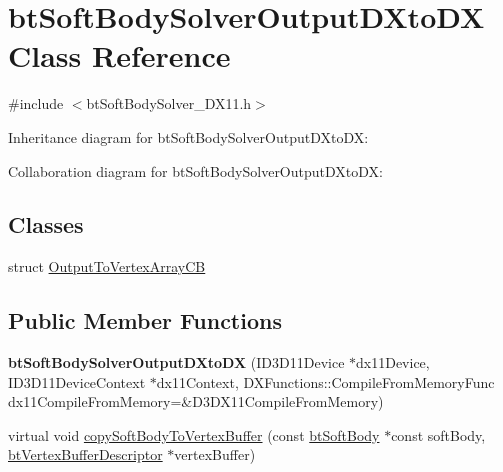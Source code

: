 \hypertarget{classbt_soft_body_solver_output_d_xto_d_x}{\section{bt\+Soft\+Body\+Solver\+Output\+D\+Xto\+D\+X Class Reference}
\label{classbt_soft_body_solver_output_d_xto_d_x}
}


{\ttfamily \#include $<$bt\+Soft\+Body\+Solver\+\_\+\+D\+X11.\+h$>$}



Inheritance diagram for bt\+Soft\+Body\+Solver\+Output\+D\+Xto\+D\+X\+:


Collaboration diagram for bt\+Soft\+Body\+Solver\+Output\+D\+Xto\+D\+X\+:
\subsection*{Classes}
\begin{DoxyCompactItemize}
\item 
struct \hyperlink{structbt_soft_body_solver_output_d_xto_d_x_1_1_output_to_vertex_array_c_b}{Output\+To\+Vertex\+Array\+C\+B}
\end{DoxyCompactItemize}
\subsection*{Public Member Functions}
\begin{DoxyCompactItemize}
\item 
\hypertarget{classbt_soft_body_solver_output_d_xto_d_x_a44a6df40918be2895144e74f1e4c36a2}{{\bfseries bt\+Soft\+Body\+Solver\+Output\+D\+Xto\+D\+X} (I\+D3\+D11\+Device $\ast$dx11\+Device, I\+D3\+D11\+Device\+Context $\ast$dx11\+Context, D\+X\+Functions\+::\+Compile\+From\+Memory\+Func dx11\+Compile\+From\+Memory=\&D3\+D\+X11\+Compile\+From\+Memory)}\label{classbt_soft_body_solver_output_d_xto_d_x_a44a6df40918be2895144e74f1e4c36a2}

\item 
virtual void \hyperlink{classbt_soft_body_solver_output_d_xto_d_x_ab1bb3e5dd8a6e45ad6063398682806cb}{copy\+Soft\+Body\+To\+Vertex\+Buffer} (const \hyperlink{classbt_soft_body}{bt\+Soft\+Body} $\ast$const soft\+Body, \hyperlink{classbt_vertex_buffer_descriptor}{bt\+Vertex\+Buffer\+Descriptor} $\ast$vertex\+Buffer)
\end{DoxyCompactItemize}

